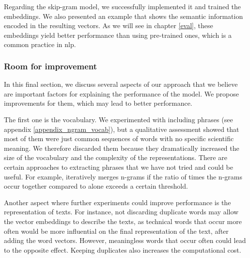 Regarding the skip-gram model, we successfully implemented it and trained the embeddings. We also presented an example that shows the semantic information encoded in the resulting vectors. As we will see in chapter \ref{eval}, these embeddings yield better performance than using pre-trained ones, which is a common practice in \acrlong{nlp}.

\subsubsection{Room for improvement}

In this final section, we discuss several aspects of our approach that we believe are important factors for explaining the performance of the model. We propose improvements for them, which may lead to better performance.

The first one is the vocabulary. We experimented with including phrases (see appendix \ref{appendix_ngram_vocab}), but a qualitative assessment showed that most of them were just common sequences of words with no specific scientific meaning. We therefore discarded them because they dramatically increased the size of the vocabulary and the complexity of the representations. There are certain approaches to extracting phrases that we have not tried and could be useful. For example, \cite{mikolov2013distributed} iteratively merges n-grams if the ratio of times the n-grams occur together compared to alone exceeds a certain threshold.

Another aspect where further experiments could improve performance is the representation of texts. For instance, not discarding duplicate words may allow the vector embeddings to describe the texts, as technical words that occur more often would be more influential on the final representation of the text, after adding the word vectors. However, meaningless words that occur often could lead to the opposite effect. Keeping duplicates also increases the computational cost.
